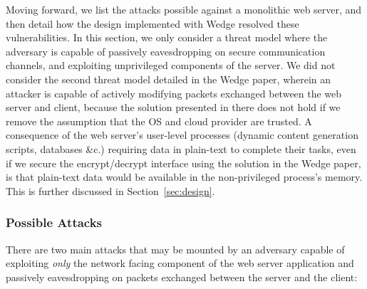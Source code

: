 \documentclass[../main.tex]{subfiles}
\begin{document}
Moving forward, we list the attacks possible against a monolithic web
server, and then detail how the design implemented with Wedge resolved
these vulnerabilities. In this section, we only consider a threat
model where the adversary is capable of passively eavesdropping on
secure communication channels, and exploiting unprivileged components
of the server. We did not consider the second threat model detailed in
the Wedge paper, wherein an attacker is capable of actively modifying
packets exchanged between the web server and client, because the
solution presented in there does not hold if we remove the assumption
that the OS and cloud provider are trusted. A consequence of the web
server's user-level processes (dynamic content generation scripts,
databases \&c.)  requiring data in plain-text to complete their tasks,
even if we secure the encrypt/decrypt interface using the solution in
the Wedge paper, is that plain-text data would be available in the
non-privileged process's memory. This is further discussed in
Section~\ref{sec:design}.

\subsubsection*{Possible Attacks}

There are two main attacks that may be mounted by an adversary capable
of exploiting \textit{only} the network facing component of the web
server application and passively eavesdropping on packets exchanged
between the server and the client:
\end{document}
